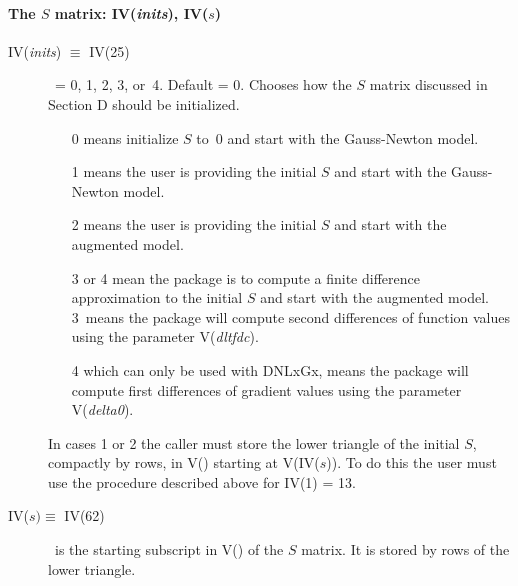 \documentclass[twoside]{MATH77}
\begin{document}
\paragraph{The $S$ matrix: IV({\em inits}), IV($s$)}
\begin{description}
\item[IV({\em inits}) $\equiv $ IV(25)]  \ = 0, 1, 2, 3, or~4. Default = 0.
Chooses how the $S$ matrix discussed in Section D should be initialized.
\begin{itemize}
\item[0] means initialize $S$ to~0 and start with the Gauss-Newton model.

\item[1] means the user is providing the initial $S$ and start with the
Gauss-Newton model.

\item[2] means the user is providing the initial $S$ and start with the
augmented model.

\item[3 or 4] mean the package is to compute a finite difference
approximation to the initial $S$ and start with the augmented model. 3~means
the package will compute second differences of function values using the
parameter V({\em dltfdc}).

\item[4] which can only be used with DNLxGx, means the
package will compute first differences of gradient values using the
parameter V({\em delta0}).
\end{itemize}
In cases 1 or 2 the caller must store the lower triangle of the initial $S$,
compactly by rows, in V() starting at V(IV($s$)). To do this the user must use
the procedure described above for IV(1) = 13.

\item[IV($s) \equiv $ IV(62)]  \ is the starting subscript in V() of the $S$
matrix. It is stored by rows of the lower triangle.
\end{description}
\end{document}
